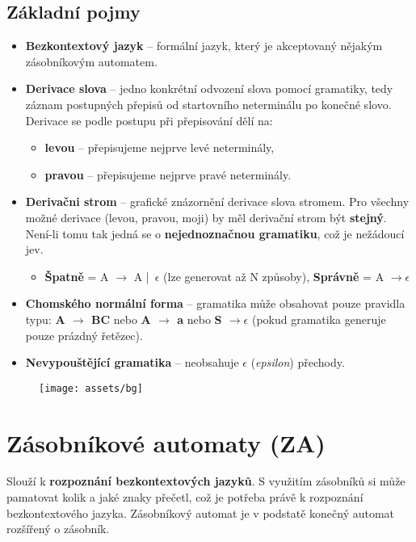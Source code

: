 \subsection{Základní pojmy}
\begin{itemize}
    \item \textbf{Bezkontextový jazyk} -- formální jazyk, který je akceptovaný nějakým zásobníkovým automatem.
    \item \textbf{Derivace slova} -- jedno konkrétní odvození slova pomocí gramatiky, tedy záznam postupných přepisů od startovního neterminálu po konečné slovo. Derivace se podle postupu při přepisování dělí na:
          \begin{itemize}
              \item \textbf{levou} -- přepisujeme nejprve levé neterminály,
              \item \textbf{pravou} -- přepisujeme nejprve pravé neterminály.
          \end{itemize}
    \item \textbf{Derivačni strom} -- grafické znázornění derivace slova stromem. Pro všechny možné derivace (levou, pravou, moji) by měl derivační strom být \textbf{stejný}. Není-li tomu tak jedná se o \textbf{nejednoznačnou gramatiku}, což je nežádoucí jev.
          \begin{itemize}
              \item \textbf{Špatně} = A $\rightarrow$ A | $\epsilon$ (lze generovat až N způsoby), \textbf{Správně} = A $\rightarrow \epsilon$
          \end{itemize}
    \item \textbf{Chomského normální forma} -- gramatika může obsahovat pouze pravidla typu: \textbf{A $\rightarrow$ BC} nebo \textbf{A $\rightarrow$ a} nebo \textbf{S $\rightarrow \epsilon$} (pokud gramatika generuje pouze prázdný řetězec).
    \item \textbf{Nevypouštějící gramatika} -- neobsahuje $\epsilon$ (\textit{epsilon}) přechody.
\end{itemize}

\begin{figure}[H]
    \centering
    \texttt{[image: assets/bg]}
\end{figure}

\section{Zásobníkové automaty (ZA)}
Slouží k \textbf{rozpoznání bezkontextových jazyků}. S využitím zásobníků si může pamatovat kolik a jaké znaky přečetl, což je potřeba právě k rozpoznání bezkontextového jazyka. Zásobníkový automat je v podstatě konečný automat rozšířený o zásobník.

